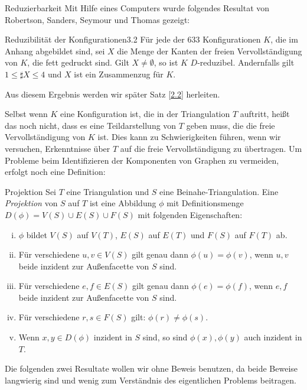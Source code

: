 \begin{section}{Reduzierbarkeit}
 Mit Hilfe eines Computers wurde folgendes Resultat von Robertson, Sanders, Seymour und Thomas gezeigt:
 
 \begin{satzl}{Reduzibilität der Konfigurationen}{3.2}
  Für jede der 633 Konfigurationen $K$, die im Anhang abgebildet sind, sei $X$ die Menge der Kanten der freien Vervollständigung von $K$, die fett gedruckt sind. Gilt $X \neq \emptyset$, so ist $K$ $D$-reduzibel. Andernfalls gilt $1\leq \sharp X \leq 4$ und $X$ ist ein Zusammenzug für $K$.
 \end{satzl}
 
 Aus diesem Ergebnis werden wir später Satz \ref{2.2} herleiten.

 Selbst wenn $K$ eine Konfiguration ist, die in der Triangulation $T$ auftritt, heißt das noch nicht, dass es eine Teildarstellung von $T$ geben muss, die die freie Vervollständigung von $K$ ist. Dies kann zu Schwierigkeiten führen, wenn wir versuchen, Erkenntnisse über $T$ auf die freie Vervollständigung zu übertragen. Um Probleme beim Identifizieren der Komponenten von Graphen zu vermeiden, erfolgt noch eine Definition:
 
 \begin{definition}{Projektion}
  Sei $T$ eine Triangulation und $S$ eine Beinahe-Triangulation. Eine \textit{Projektion} von $S$ auf $T$ ist eine Abbildung $\phi$ mit Definitionsmenge $D(\phi) = V(S)\cup E(S)\cup F(S)$ mit folgenden Eigenschaften:
  \begin{enumerate}[(i)]
   \item $\phi$ bildet $V(S)$ auf $V(T)$, $E(S)$ auf $E(T)$ und $F(S)$ auf $F(T)$ ab.
   \item Für verschiedene $u,v \in V(S)$ gilt genau dann $\phi(u) = \phi(v)$, wenn $u,v$ beide inzident zur Außenfacette von $S$ sind.
   \item Für verschiedene $e,f \in E(S)$ gilt genau dann $\phi(e) = \phi(f)$, wenn $e,f$ beide inzident zur Außenfacette von $S$ sind.
   \item Für verschiedene $r,s \in F(S)$ gilt: $\phi(r) \neq \phi(s)$.
   \item Wenn $x,y \in D(\phi)$ inzident in $S$ sind, so sind $\phi(x),\phi(y)$ auch inzident in $T$.
  \end{enumerate}
 \end{definition}
 
 Die folgenden zwei Resultate wollen wir ohne Beweis benutzen, da beide Beweise langwierig sind und wenig zum Verständnis des eigentlichen Problems beitragen.


\end{section}

